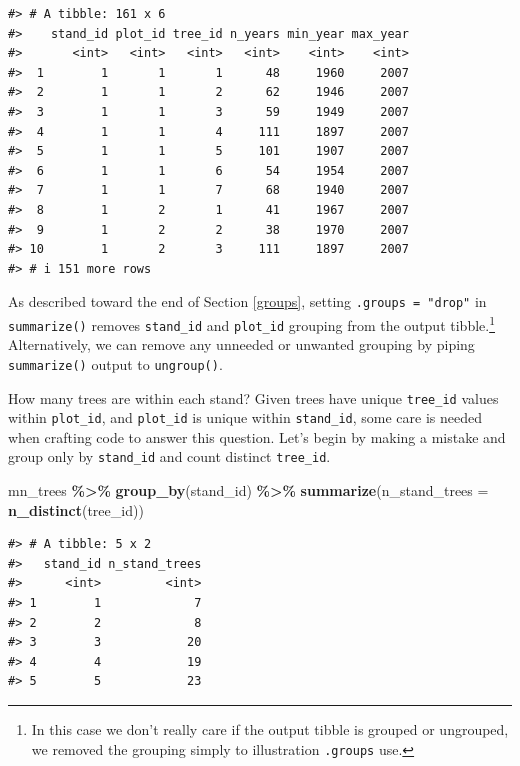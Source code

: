 \documentclass[
  11pt,
]{krantz}
\newenvironment{Shaded}{\begin{snugshade}}{\end{snugshade}}
\newcommand{\DataTypeTok}[1]{\textcolor[rgb]{0.13,0.29,0.53}{#1}}
\newcommand{\KeywordTok}[1]{\textcolor[rgb]{0.13,0.29,0.53}{\textbf{#1}}}
\newcommand{\NormalTok}[1]{#1}
\newcommand{\OperatorTok}[1]{\textcolor[rgb]{0.81,0.36,0.00}{\textbf{#1}}}
\newcommand{\StringTok}[1]{\textcolor[rgb]{0.31,0.60,0.02}{#1}}
\theoremstyle{definition}
\theoremstyle{definition}
\theoremstyle{definition}
\theoremstyle{definition}
\theoremstyle{remark}
\begin{document}
\begin{verbatim}
#> # A tibble: 161 x 6
#>    stand_id plot_id tree_id n_years min_year max_year
#>       <int>   <int>   <int>   <int>    <int>    <int>
#>  1        1       1       1      48     1960     2007
#>  2        1       1       2      62     1946     2007
#>  3        1       1       3      59     1949     2007
#>  4        1       1       4     111     1897     2007
#>  5        1       1       5     101     1907     2007
#>  6        1       1       6      54     1954     2007
#>  7        1       1       7      68     1940     2007
#>  8        1       2       1      41     1967     2007
#>  9        1       2       2      38     1970     2007
#> 10        1       2       3     111     1897     2007
#> # i 151 more rows
\end{verbatim}

As described toward the end of Section \ref{groups}, setting \texttt{.groups\ =\ "drop"} in \texttt{summarize()} removes \texttt{stand\_id} and \texttt{plot\_id} grouping from the output tibble.\footnote{In this case we don't really care if the output tibble is grouped or ungrouped, we removed the grouping simply to illustration \texttt{.groups} use.} Alternatively, we can remove any unneeded or unwanted grouping by piping \texttt{summarize()} output to \texttt{ungroup()}.

How many trees are within each stand? Given trees have unique \texttt{tree\_id} values within \texttt{plot\_id}, and \texttt{plot\_id} is unique within \texttt{stand\_id}, some care is needed when crafting code to answer this question. Let's begin by making a mistake and group only by \texttt{stand\_id} and count distinct \texttt{tree\_id}.

\begin{Shaded}
\begin{Highlighting}[]
\NormalTok{mn\_trees }\OperatorTok{\%\textgreater{}\%}\StringTok{ }\KeywordTok{group\_by}\NormalTok{(stand\_id) }\OperatorTok{\%\textgreater{}\%}\StringTok{ }
\StringTok{  }\KeywordTok{summarize}\NormalTok{(}\DataTypeTok{n\_stand\_trees =} \KeywordTok{n\_distinct}\NormalTok{(tree\_id))}
\end{Highlighting}
\end{Shaded}

\begin{verbatim}
#> # A tibble: 5 x 2
#>   stand_id n_stand_trees
#>      <int>         <int>
#> 1        1             7
#> 2        2             8
#> 3        3            20
#> 4        4            19
#> 5        5            23
\end{verbatim}
\end{document}
